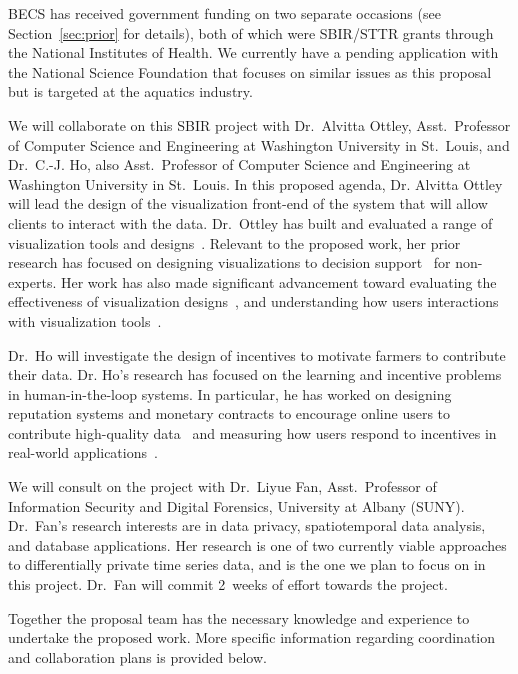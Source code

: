 BECS has received government funding on two separate occasions
(see Section~\ref{sec:prior} for details), both of which were SBIR/STTR
grants through the National Institutes of Health.  We currently
have a pending application with the National Science Foundation
that focuses on similar issues as this proposal but is targeted at
the aquatics industry.

We will collaborate on this SBIR project with Dr.~Alvitta Ottley,
Asst.~Professor of Computer Science and Engineering at Washington University
in St.~Louis, and Dr.~C.-J. Ho, also
Asst.~Professor of Computer Science and Engineering at Washington University
in St.~Louis.
In this proposed agenda, Dr. Alvitta Ottley will lead the design
of the visualization front-end of the system that will allow clients
to interact with the data.
Dr.~Ottley has built and evaluated a range of visualization tools
and designs~\cite{brown2014finding, hakone2017proact,ottley2015personality,peck2013using}. 
Relevant to the proposed work, her prior research has focused on designing visualizations to decision support~\cite{hakone2017proact,ottley2012visually,ottley2016improving} for non-experts. 
Her work has also made significant advancement toward evaluating the effectiveness of visualization designs~\cite{peck2013using,ziemkiewicz2013visualization}, and understanding how users interactions with visualization tools~\cite{brown2014finding,ottley2015personality}.  

Dr.~Ho will investigate the design of incentives to motivate farmers to
contribute their data. Dr. Ho's research has focused on the learning and incentive
problems in human-in-the-loop systems. In particular, he has worked on designing
reputation systems and monetary contracts to encourage online users
to contribute high-quality data~\cite{HSV14,HZVS12}
and measuring how users respond to incentives in 
real-world applications~\cite{hssv15}.


We will consult on the project with Dr.~Liyue Fan, Asst.~Professor
of Information Security and Digital Forensics, University at Albany (SUNY).
Dr.~Fan's research interests are in data privacy, spatiotemporal data
analysis, and database applications.  Her research is one of two
currently viable approaches to differentially private time series data,
and is the one we plan to focus on in this project.
Dr.~Fan will commit 2~weeks of effort towards the project.

Together the proposal team has the necessary knowledge and experience to undertake the proposed work. 
More specific information regarding coordination and collaboration plans is
provided below.

